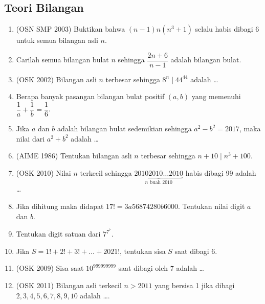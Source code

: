 \documentclass[11pt]{scrartcl}
\begin{document}
\subsection{Teori Bilangan}
\begin{enumerate}
    \item (OSN SMP 2003) Buktikan bahwa $(n-1)n(n^3+1)$ selalu habis dibagi 6 untuk semua bilangan asli $n$.
    
    \item Carilah semua bilangan bulat $n$ sehingga $\dfrac{2n+6}{n-1}$ adalah bilangan bulat.
    
    \item (OSK 2002) Bilangan asli $n$ terbesar sehingga $8^n \mid 44^{44}$ adalah \dots
    
    \item Berapa banyak pasangan bilangan bulat positif $(a,b)$ yang memenuhi $\dfrac{1}{a}+\dfrac{1}{b}=\dfrac{1}{6}$.
    
    \item Jika $a$ dan $b$ adalah bilangan bulat sedemikian sehingga $a^2-b^2=2017$, maka nilai dari $a^2+b^2$ adalah \dots
    
    \item (AIME 1986) Tentukan bilangan asli $n$ terbesar sehingga $n+10 \mid n^3+100$.
    
    \item (OSK 2010) Nilai $n$ terkecil sehingga $\underbrace{20102010\dots2010}_\text{$n$ buah 2010}$ habis dibagi 99 adalah \dots
    
    \item Jika dihitung maka didapat $17! = 3a56874280b6000$. Tentukan nilai digit $a$ dan $b$.
    
    \item Tentukan digit satuan dari $7^{7^7}$.
    
    \item Jika $S=1!+2!+3!+\dots+2021!$, tentukan sisa $S$ saat dibagi 6.
    
    \item (OSK 2009) Sisa saat $10^{999999999}$ saat dibagi oleh 7 adalah \dots
    \item (OSK 2011) Bilangan asli terkecil $n>2011$ yang bersisa 1 jika dibagi $2,3,4,5,6,7,8,9,10$ adalah \dots.
\end{enumerate}
\end{document}
